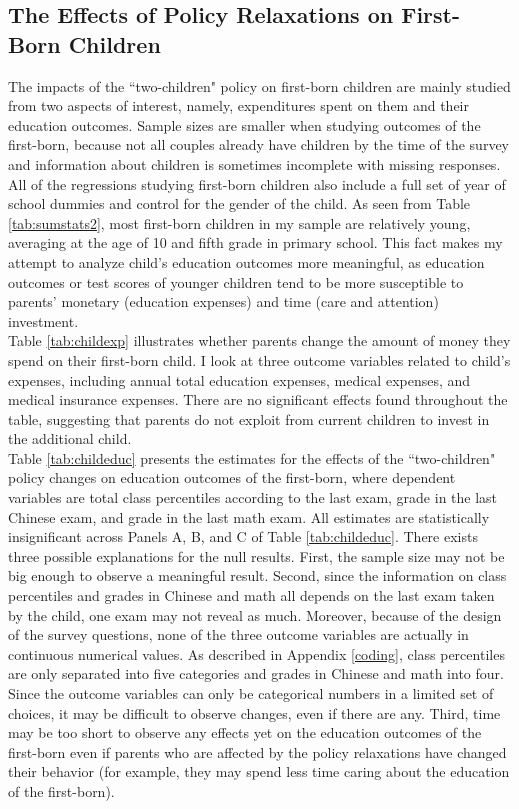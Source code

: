 \documentclass[12pt]{extarticle}
\begin{document}
\subsection{The Effects of Policy Relaxations on First-Born Children}
The impacts of the ``two-children" policy on first-born children are mainly studied from two aspects of interest, namely, expenditures spent on them and their education outcomes. Sample sizes are smaller when studying outcomes of the first-born, because not all couples already have children by the time of the survey and information about children is sometimes incomplete with missing responses. All of the regressions studying first-born children also include a full set of year of school dummies and control for the gender of the child. As seen from Table \ref{tab:sumstats2}, most first-born children in my sample are relatively young, averaging at the age of 10 and fifth grade in primary school. This fact makes my attempt to analyze child's education outcomes more meaningful, as education outcomes or test scores of younger children tend to be more susceptible to parents' monetary (education expenses) and time (care and attention) investment. \\
\indent Table \ref{tab:childexp} illustrates whether parents change the amount of money they spend on their first-born child. I look at three outcome variables related to child's expenses, including annual total education expenses, medical expenses, and medical insurance expenses. There are no significant effects found throughout the table, suggesting that parents do not exploit from current children to invest in the additional child. \\
\indent Table \ref{tab:childeduc} presents the estimates for the effects of the ``two-children" policy changes on education outcomes of the first-born, where dependent variables are total class percentiles according to the last exam, grade in the last Chinese exam, and grade in the last math exam. All estimates are statistically insignificant across Panels A, B, and C of Table \ref{tab:childeduc}. There exists three possible explanations for the null results. First, the sample size may not be big enough to observe a meaningful result. Second, since the information on class percentiles and grades in Chinese and math all depends on the last exam taken by the child, one exam may not reveal as much. Moreover, because of the design of the survey questions, none of the three outcome variables are actually in continuous numerical values. As described in Appendix \ref{coding}, class percentiles are only separated into five categories and grades in Chinese and math into four. Since the outcome variables can only be categorical numbers in a limited set of choices, it may be difficult to observe changes, even if there are any. Third, time may be too short to observe any effects yet on the education outcomes of the first-born even if parents who are affected by the policy relaxations have changed their behavior (for example, they may spend less time caring about the education of the first-born). \\
\end{document}

